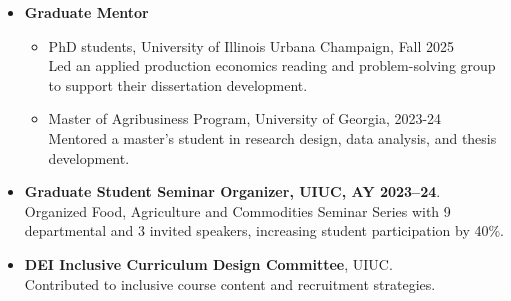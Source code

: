 
\begin{itemize}
    \item \textbf{Graduate Mentor}
\begin{itemize}
\item PhD students, University of Illinois Urbana Champaign, Fall 2025 \\
Led an applied production economics reading and problem-solving group to support their dissertation development.
\item Master of Agribusiness Program, University of Georgia, 2023-24 \\
    Mentored a master’s student in research design, data analysis, and thesis development. 
\end{itemize}
    \item \textbf{Graduate Student Seminar Organizer, UIUC, AY 2023–24}. \\
    Organized Food, Agriculture and Commodities Seminar Series with 9 departmental and 3 invited speakers, increasing student participation by 40\%.
   \item \textbf{DEI Inclusive Curriculum Design Committee}, UIUC.\\
   Contributed to inclusive course content and recruitment strategies.
\end{itemize}

